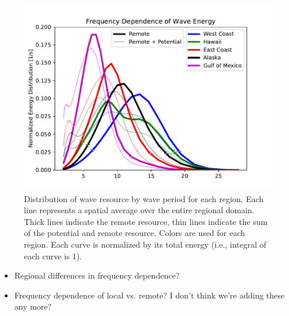 \begin{figure}[ht]
  \centering
  \includegraphics[width=\linewidth]{../fig/TotalResource_Freq02.pdf}
  \caption{Distribution of wave resource by wave period for each region. Each line represents a spatial average over the entire regional domain. Thick lines indicate the remote resource, thin lines indicate the sum of the potential and remote resource. Colors are used for each region. Each curve is normalized by its total energy (i.e., integral of each curve is 1).}
  \label{fig:remote-freq}
\end{figure}


\begin{itemize}
\item Regional differences in frequency dependence?
\item Frequency dependence of local vs. remote?
I don't think we're adding these any more?
\end{itemize}


